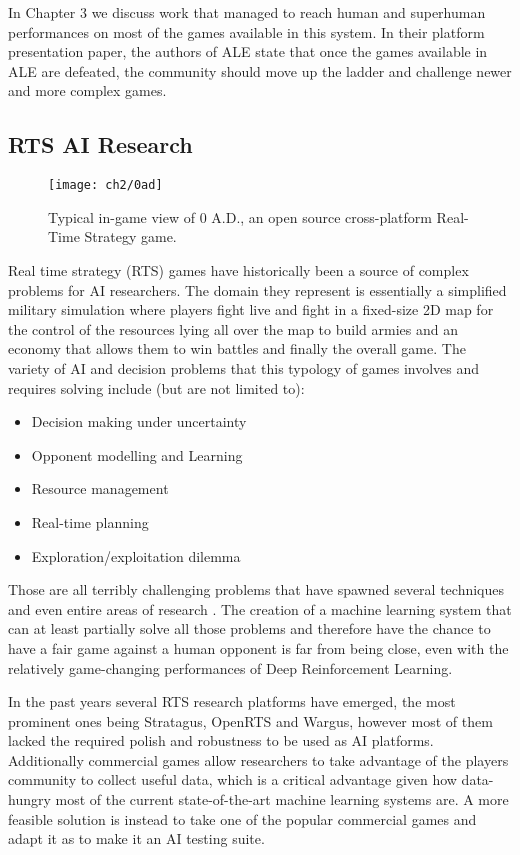 In Chapter 3 we discuss work that managed to reach human and superhuman
performances on most of the games available in this system. In their platform
presentation paper, the authors of ALE state that once the games available in
ALE are defeated, the community should move up the ladder and challenge newer
and more complex games.

\subsection{RTS AI Research}

\begin{figure}[h]
    \centering
    \texttt{[image: ch2/0ad]}
    \caption{Typical in-game view of 0 A.D., an open source cross-platform
      Real-Time Strategy game.}
    \label{fig:0ad}
\end{figure}


Real time strategy (RTS) games have historically been a source of complex
problems for AI researchers. The domain they represent is essentially a
simplified military simulation where players fight live and fight in a
fixed-size 2D map for the control of the resources lying all over the map to
build armies and an economy that allows them to win battles and finally the
overall game. The variety of AI and decision problems that this typology of
games involves and requires solving include (but are not limited to):

\begin{itemize}
  \item Decision making under uncertainty
  \item Opponent modelling and Learning
  \item Resource management
  \item Real-time planning
  \item Exploration/exploitation dilemma
\end{itemize}

Those are all terribly challenging problems that have spawned several techniques
and even entire areas of research \citep{buro2003real}. The creation of a
machine learning system that can at least partially solve all those problems and
therefore have the chance to have a fair game against a human opponent is far
from being close, even with the relatively game-changing performances of Deep
Reinforcement Learning.

In the past years several RTS research platforms have emerged, the most
prominent ones being Stratagus, OpenRTS and Wargus, however most of them lacked
the required polish and robustness to be used as AI platforms. Additionally
commercial games allow researchers to take advantage of the players community to
collect useful data, which is a critical advantage given how data-hungry most of
the current state-of-the-art machine learning systems are. A more feasible
solution is instead to take one of the popular commercial games and adapt it as
to make it an AI testing suite.

